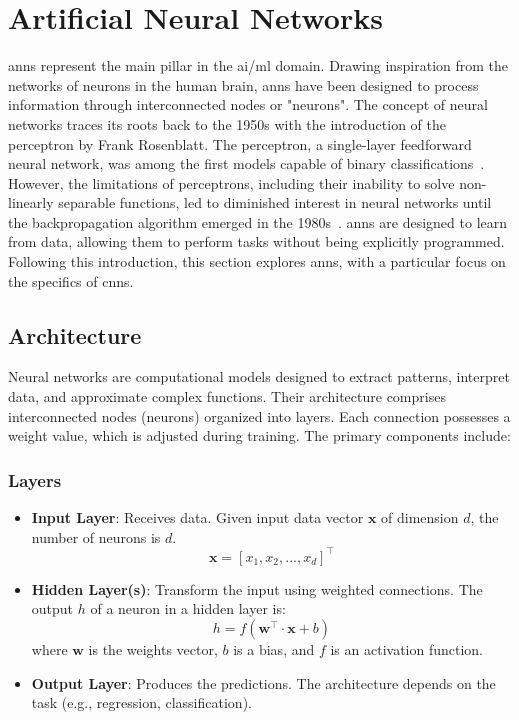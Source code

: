 \section{Artificial Neural Networks}
\glspl{ann} represent the main pillar in the \gls{ai}/\gls{ml} domain. Drawing inspiration from the networks of neurons in the human brain, \glspl{ann} have been designed to process information through interconnected nodes or "neurons". The concept of neural networks traces its roots back to the 1950s with the introduction of the perceptron by Frank Rosenblatt. The perceptron, a single-layer feedforward neural network, was among the first models capable of binary classifications~\cite{rosenblatt1958perceptron}. However, the limitations of perceptrons, including their inability to solve non-linearly separable functions, led to diminished interest in neural networks until the backpropagation algorithm emerged in the 1980s~\cite{rumelhart1986learning}. \glspl{ann} are designed to learn from data, allowing them to perform tasks without being explicitly programmed. Following this introduction, this section explores \glspl{ann}, with a particular focus on the specifics of \glspl{cnn}.

\subsection{Architecture}

Neural networks are computational models designed to extract patterns, interpret data, and approximate complex functions. Their architecture comprises interconnected nodes (neurons) organized into layers. Each connection possesses a weight value, which is adjusted during training. The primary components include:

\subsubsection{Layers}

\begin{itemize}
	\item \textbf{Input Layer}: Receives data. Given input data vector \( \mathbf{x} \) of dimension \( d \), the number of neurons is \( d \).
	\[
	\mathbf{x} = [x_1, x_2, ..., x_d]^\intercal
	\]
	
	\item \textbf{Hidden Layer(s)}: Transform the input using weighted connections. The output \( h \) of a neuron in a hidden layer is:
	\[
	h = f(\mathbf{w^\intercal} \cdot \mathbf{x} + b)
	\]
	where \( \mathbf{w} \) is the weights vector, \( b \) is a bias, and \( f \) is an activation function.
	
	\item \textbf{Output Layer}: Produces the predictions. The architecture depends on the task (e.g., regression, classification).
\end{itemize}

